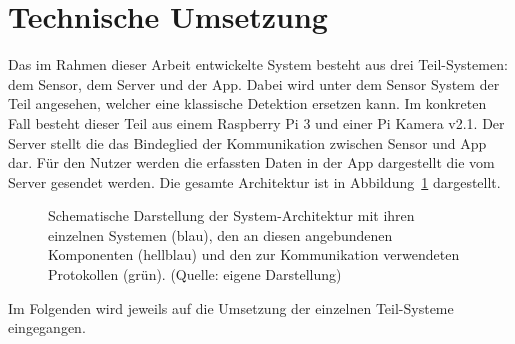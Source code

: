 \section{Technische Umsetzung}\label{ch:Umsetzung}
Das im Rahmen dieser Arbeit entwickelte System besteht aus drei Teil-Systemen: dem Sensor, dem Server und der App.
Dabei wird unter dem Sensor System der Teil angesehen, welcher eine klassische Detektion ersetzen kann.
Im konkreten Fall besteht dieser Teil aus einem Raspberry Pi 3 und einer Pi Kamera v2.1.
Der Server stellt die das Bindeglied der Kommunikation zwischen Sensor und App dar.
Für den Nutzer werden die erfassten Daten in der App dargestellt die vom Server gesendet werden.
Die gesamte Architektur ist in Abbildung~\ref{fig:Architektur} dargestellt.

\begin{figure}[h]
    \myImagePos{}
    
    \caption[Schematische Darstellung der System-Architektur]{Schematische Darstellung der System-Architektur mit ihren einzelnen Systemen (blau), den an diesen angebundenen Komponenten (hellblau) und den zur Kommunikation verwendeten Protokollen (grün). (Quelle: eigene Darstellung)}
    \label{fig:Architektur}
\end{figure}

Im Folgenden wird jeweils auf die Umsetzung der einzelnen Teil-Systeme eingegangen.




